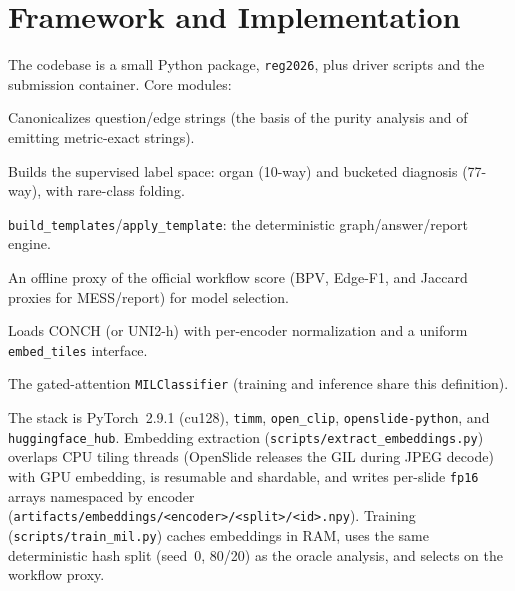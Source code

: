 \documentclass[11pt,a4paper]{article}
\newcommand{\code}[1]{\texttt{\small #1}}
\begin{document}
\section{Framework and Implementation}
\label{sec:framework}

The codebase is a small Python package, \code{reg2026}, plus driver scripts and the submission
container. Core modules:
\begin{description}[leftmargin=1.2em,style=nextline,itemsep=1pt]
  \item[\code{canon.py}] Canonicalizes question/edge strings (the basis of the purity analysis
        and of emitting metric-exact strings).
  \item[\code{labels.py}] Builds the supervised label space: organ (10-way) and bucketed
        diagnosis (77-way), with rare-class folding.
  \item[\code{templates.py}] \code{build\_templates}/\code{apply\_template}: the deterministic
        graph/answer/report engine.
  \item[\code{metrics.py}] An offline proxy of the official workflow score (BPV, Edge-F1, and
        Jaccard proxies for MESS/report) for model selection.
  \item[\code{encoder.py}] Loads CONCH (or UNI2-h) with per-encoder normalization and a uniform
        \code{embed\_tiles} interface.
  \item[\code{mil.py}] The gated-attention \code{MILClassifier} (training and inference share
        this definition).
\end{description}
The stack is PyTorch~2.9.1 (cu128), \code{timm}, \code{open\_clip}, \code{openslide-python}, and
\code{huggingface\_hub}. Embedding extraction (\code{scripts/extract\_embeddings.py}) overlaps
CPU tiling threads (OpenSlide releases the GIL during JPEG decode) with GPU embedding, is
resumable and shardable, and writes per-slide \code{fp16} arrays namespaced by encoder
(\code{artifacts/embeddings/<encoder>/<split>/<id>.npy}). Training
(\code{scripts/train\_mil.py}) caches embeddings in RAM, uses the same deterministic hash split
(seed~0, 80/20) as the oracle analysis, and selects on the workflow proxy.
\end{document}
